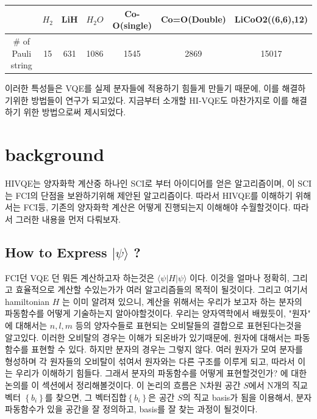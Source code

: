 \documentclass[10pt]{article}
\begin{document}
\begin{enumerate}[label=3)]
% 
\begin{center}
\begin{tabular}{@{}ccccccc@{}}
\toprule
                   & \(H_2\) & LiH & \(H_2O\) & Co-O(single) & Co=O(Double) & LiCoO2((6,6),12)          \\ \midrule
\# of Pauli string & 15   & 631 & 1086  & 1545         & 2869         & \multicolumn{1}{c}{15017} \\ \bottomrule
\end{tabular}
\end{center}

이러한 특성들은 VQE를 실제 분자들에 적용하기 힘들게 만들기 때문에, 이를 해결하기위한 방법들이 연구가 되고있다. 지금부터 소개할 HI-VQE도 마찬가지로 이를 해결하기 위한 방법으로써 제시되었다.
\end{enumerate}
\newpage

\section{background}
HIVQE는 양자화학 계산중 하나인 SCI로 부터 아이디어를 얻은 알고리즘이며, 이 SCI는 FCI의 단점을 보완하기위해 제안된 알고리즘이다. 
따라서 HIVQE를 이해하기 위해서는 FCI등, 기존의 양자화학 계산은 어떻게 진행되는지 이해해야 수월할것이다. 따라서 그러한 내용을 먼저 다뤄보자. 

\subsection{How to Express \(|\psi \rangle\) ?}
FCI던 VQE 던 뭐든 계산하고자 하는것은 \(\langle \psi|H|\psi \rangle\) 이다. 이것을 얼마나 정확히,
그리고 효율적으로 계산할 수있는가가 여러 알고리즘들의 목적이 될것이다. 그리고 여기서 hamiltonian \(H\) 는 이미 알려져 있으니, 계산을 위해서는 우리가 보고자 하는 분자의 파동함수를 어떻게 기술하는지 알아야할것이다.
우리는 양자역학에서 배웠듯이, "원자" 에 대해서는 \(n,l,m\) 등의 양자수들로 표현되는 오비탈들의 결합으로 표현된다는것을 알고있다.
이러한 오비탈의 경우는 이해가 되온바가 있기때문에, 원자에 대해서는 파동함수를 표현할 수 있다. 하지만 분자의 경우는 그렇지 않다. 
여러 원자가 모여 분자를 형성하며 각 원자들의 오비탈이 섞여서 원자와는 다른 구조를 이루게 되고, 따라서 이는 우리가 이해하기 힘들다. 
그래서 분자의 파동함수를 어떻게 표현할것인가? 에 대한 논의를 이 섹션에서 정리해볼것이다.
이 논리의 흐름은 N차원 공간 \(S\)에서 N개의 직교벡터 \(\left\{b_i\right\}\)를 찾으면, 그 벡터집합\(\left\{b_i\right\}\)은 공간 \(S\)의 직교 basis가 됨을 이용해서, 
분자 파동함수가 있을 공간을 잘 정의하고, basis를 잘 찾는 과정이 될것이다. 
\end{document}

